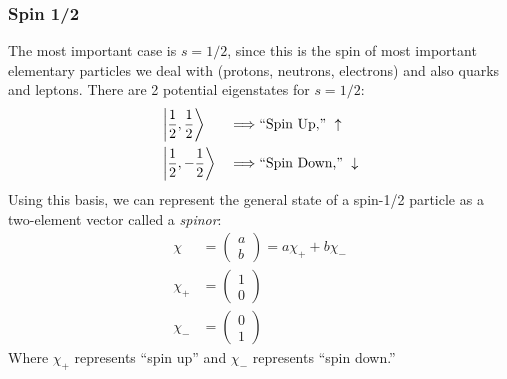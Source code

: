 \documentclass[a4paper]{article}
\begin{document}
\subsubsection{Spin 1/2}
The most important case is $s=1/2$, since this is the spin of most important
elementary particles we deal with (protons, neutrons, electrons) and also
quarks and leptons. There are 2 potential eigenstates for $s=1/2$:
\begin{align*}
	&\left\lvert \frac12,\frac12\right\rangle &\implies &\text{``Spin Up,'' }\uparrow\\
	&\left\lvert \frac12,-\frac12\right\rangle &\implies &\text{``Spin Down,'' }\downarrow
\end{align*}
Using this basis, we can represent the general state of a spin-1/2 particle
as a two-element vector called a \emph{spinor}:
\begin{align*}
	\chi &= \begin{pmatrix}a\\b\end{pmatrix}
	     = a\chi_++b\chi_-\\
	\chi_+ &= \begin{pmatrix}1\\0\end{pmatrix}\\
	\chi_- &= \begin{pmatrix}0\\1\end{pmatrix}
\end{align*}
Where $\chi_+$ represents ``spin up'' and $\chi_-$ represents ``spin down.''
\end{document}
